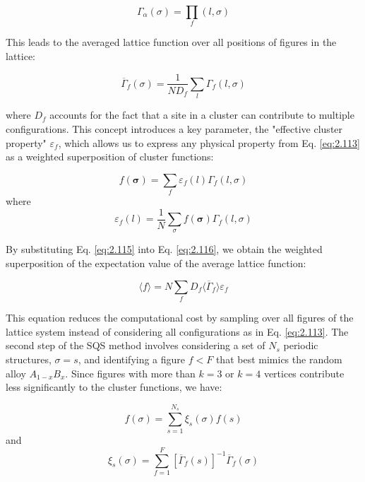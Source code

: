 \begin{equation}
	\Gamma_\alpha(\sigma) = \prod_f (l, \sigma)
\end{equation}

This leads to the averaged lattice function over all positions of figures in the lattice:

\begin{equation}
	\overline{\Gamma}_f(\sigma) = \frac{1}{N D_f} \sum_l \Gamma_f(l, \sigma)
	\label{eq:2.115}
\end{equation}

where \(D_f\) accounts for the fact that a site in a cluster can contribute to multiple configurations. This concept introduces a key parameter, the "effective cluster property" \(\varepsilon_f\), which allows us to express any physical property from Eq. \ref{eq:2.113} as a weighted superposition of cluster functions:

\begin{equation}
	f(\mathbf{\sigma}) = \sum_f \varepsilon_f(l) \Gamma_f(l, \sigma)
	\label{eq:2.116}
\end{equation}
where
\begin{equation}
	\varepsilon_f(l) = \frac{1}{N} \sum_\sigma f(\mathbf{\sigma}) \Gamma_f(l, \sigma)
	\label{eq:2.117}
\end{equation}

By substituting Eq. \ref{eq:2.115} into Eq. \ref{eq:2.116}, we obtain the weighted superposition of the expectation value of the average lattice function:

\begin{equation}
	\langle f \rangle = N \sum_f D_f \langle \overline{\Gamma}_f \rangle \varepsilon_f
	\label{eq:2.118}
\end{equation}

This equation reduces the computational cost by sampling over all figures of the lattice system instead of considering all configurations as in Eq. \ref{eq:2.113}. The second step of the SQS method involves considering a set of \(N_s\) periodic structures, \(\sigma = s\), and identifying a figure \(f < F\) that best mimics the random alloy \(A_{1-x}B_x\). Since figures with more than \(k = 3\) or \(k = 4\) vertices contribute less significantly to the cluster functions, we have:

\begin{equation}
	f(\sigma) = \sum_{s=1}^{N_s} \xi_s(\sigma) f(s)
\end{equation}
and
\begin{equation}
	\xi_s(\sigma) = \sum_{f=1}^{F} \left[ \overline{\Gamma}_{f}(s) \right]^{-1} \overline{\Gamma}_{f}(\sigma)
\end{equation}

